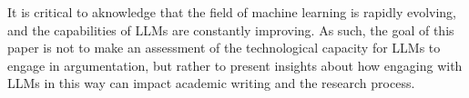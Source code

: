 It is critical to aknowledge that the field of machine learning is rapidly
evolving, and the capabilities of LLMs are constantly improving. As such, the
goal of this paper is not to make an assessment of the technological capacity
for LLMs to engage in argumentation, but rather to present insights about how
engaging with LLMs in this way can impact academic writing and the research
process.
